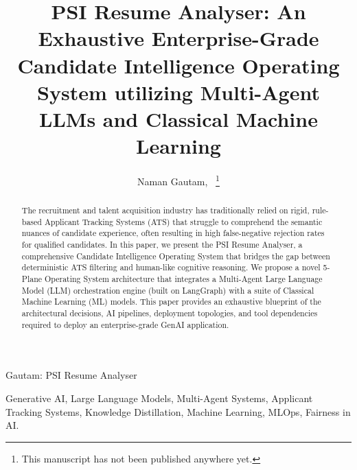 \documentclass[10pt,journal,compsoc]{IEEEtran}
\begin{document}
\sloppy

\title{PSI Resume Analyser: An Exhaustive Enterprise-Grade Candidate Intelligence Operating System utilizing Multi-Agent LLMs and Classical Machine Learning}

\author{Naman Gautam,~%
%
\thanks{This manuscript has not been published anywhere yet.}}

%
{Gautam: PSI Resume Analyser}

\maketitle

\begin{abstract}
The recruitment and talent acquisition industry has traditionally relied on rigid, rule-based Applicant Tracking Systems (ATS) that struggle to comprehend the semantic nuances of candidate experience, often resulting in high false-negative rejection rates for qualified candidates. In this paper, we present the PSI Resume Analyser, a comprehensive Candidate Intelligence Operating System that bridges the gap between deterministic ATS filtering and human-like cognitive reasoning. We propose a novel 5-Plane Operating System architecture that integrates a Multi-Agent Large Language Model (LLM) orchestration engine (built on LangGraph) with a suite of Classical Machine Learning (ML) models. This paper provides an exhaustive blueprint of the architectural decisions, AI pipelines, deployment topologies, and tool dependencies required to deploy an enterprise-grade GenAI application.
\end{abstract}

\begin{IEEEkeywords}
Generative AI, Large Language Models, Multi-Agent Systems, Applicant Tracking Systems, Knowledge Distillation, Machine Learning, MLOps, Fairness in AI.
\end{IEEEkeywords}
\end{document}
